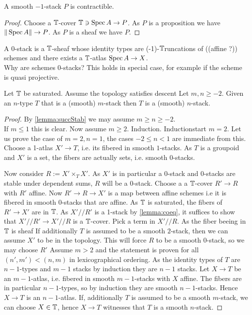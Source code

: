 \documentclass{article}
\newcommand{\affineA}{(affine ?)}
\newcommand{\truncation}{$\bT$runcation}
\newcommand{\red}[1]{{\color{red} #1}}
\begin{document}
\begin{lemma}
    A smooth $-1$-stack $P$ is contractible.
\end{lemma}
\begin{proof}
    Choose a $\mathbb{T}$-cover $\mathbb{T} \ni \operatorname{Spec} A \to P$. As $P$ is a proposition we have $\| \operatorname{Spec} A\| \to P$. As $P$ is a sheaf we have $P$.
\end{proof}
\begin{example}
    A  0-stack is a $\mathbb{T}$-sheaf whose identity types are \red{(-1)-\truncation s of} (\affineA) schemes and there exists a $\mathbb{T}$-atlas $\operatorname{Spec} A \to X$. \\
    Why are schemes  0-stacks? This holds in special case, for example if the scheme is quasi projective. 
\end{example}
\begin{theorem}{\label{thm:stack}}
    Let $\mathbb{T}$ be saturated. Assume the topology satisfies descent Let $m , n \ge -2$. Given an $n$-type $T$ that is a  (smooth) $m$-stack then $T$ is a  (smooth) $n$-stack.
\end{theorem}


\begin{proof}
    
    By \ref{lemma:succStab} we may assume $m \ge n \ge -2$. \\
    If $m \le 1$ this is clear. Now assume $m \ge 2$. 
    Induction. 
    Inductionstart $m = 2$. Let us prove the case of $m = 2,n=1$, the cases $-2 \le n<1$ are immediate from this. \\
    Choose a 1-atlas $X' \to T$, i.e. its fibered in smooth $1$-stacks. As $T$ is a groupoid and $X'$ is a set, the fibers are actually sets, i.e. smooth 0-stacks. 
    
    Now consider $R := X' \times_T X'$. As $X'$ is in particular a  0-stack and  0-stacks are stable under dependent sums, $R$ will be a  0-stack. Choose a  a $\mathbb{T}$-cover $R' \to R$ with $R'$ affine. Now $R' \to R \to X'$ is a map between affine schemes i.e it is fibered in smooth 0-stacks that are affine. As $\mathbb{T}$ is saturated, the fibers of $R' \to X'$ are in $\mathbb{T}$. As $X' // R'$ is a  1-stack by \ref{lemma:coeq}, it suffices to show that $X' // R' \to X' // R$ is a $\mathbb{T}$-cover. Pick a term in $X' // R$. As the fiber beeing in $\mathbb{T}$ is sheaf 
    If additionally $T$ is assumed to be a smooth $2$-stack, then we can assume $X'$ to be in the topology. This will force $R$ to be a smooth $0$-stack, so we may choose $R'$
    Assume $m > 2$ and the statement is proven for all $(n',m') < (n,m)$ in lexicographical ordering. As the identity types of $T$ are $n-1$-types and  $m-1$ stacks by induction they are  $n-1$ stacks. Let $X \to T$ be an $m-1$-atlas, i.e. fibered in smooth $m-1$-stacks with $X$ affine. The fibers are in particular $n-1$-types, so by induction they are smooth $n-1$-stacks. Hence $X \to T$ is an $n-1$-atlas. If, additionally $T$ is assumed to be a smooth $m$-stack, we can choose $X \in \mathbb{T}$, hence $X \to T$ witnesses that $T$ is a smooth $n$-stack.
    
\end{proof}
\end{document}
